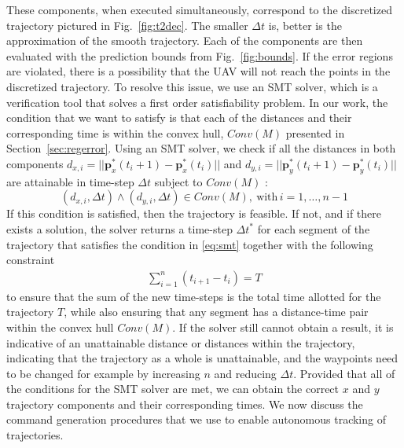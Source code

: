 \documentclass[letterpaper, 10 pt, conference]{ieeeconf}  %
\newcommand\NB[1]{$\spadesuit$\footnote{NB: #1}}
\begin{document}
These components, when executed simultaneously, correspond to the discretized trajectory pictured in Fig.~\ref{fig:t2dec}. The smaller $\Delta t$ is, better is the approximation of the smooth trajectory. Each of the components are then evaluated with the prediction bounds from Fig.~\ref{fig:bounds}. If the error regions are violated, there is a possibility that the UAV will not reach the points in the discretized trajectory. To resolve this issue, we use an SMT solver, which is a verification tool that solves a first order satisfiability problem. In our work, the condition that we want to satisfy is that each of the distances and their corresponding time is within the convex hull, $Conv(M)$ presented in Section~\ref{sec:regerror}. Using an SMT solver, we check if all the distances in both components ${d}_{x,i}=||\bm{p}_x^*(t_i+1)-\bm{p}_x^*(t_i)||$ and ${d}_{y,i}=||\bm{p}_y^*(t_i+1)-\bm{p}_y^*(t_i)||$ are attainable in time-step $\Delta t$ subject to $Conv(M)$ : 
\begin{equation}\label{eq:smt}
    ({d}_{x,i},\Delta t) \wedge ({d}_{y,i},\Delta t) \in Conv(M), ~\textrm{with}\, i = 1,\ldots,n-1
\end{equation}
If this condition is satisfied, then the trajectory is feasible. If not, and if there exists a solution, the solver returns a time-step $\Delta t^*$ for each segment of the trajectory that satisfies the condition in \eqref{eq:smt} together with the following constraint
\begin{align}
     \sum_{i=1}^n(t_{i+1}-t_i) = T
\end{align}
to ensure that the sum of the new time-steps is the total time allotted for the trajectory $T$, while also ensuring that any segment has a distance-time pair within the convex hull $Conv(M)$. If the solver still cannot obtain a result, it is indicative of an unattainable distance or distances within the trajectory, indicating that the trajectory as a whole is unattainable, and the waypoints need to be changed for example by increasing $n$ and reducing $\Delta t$. Provided that all of the conditions for the SMT solver are met, we can obtain the correct $x$ and $y$ trajectory components and their corresponding times. We now discuss the command generation procedures that we use to enable autonomous tracking of trajectories.
\end{document}

